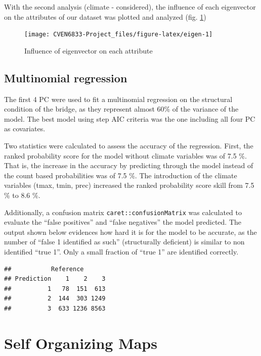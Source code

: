\documentclass[]{book}
\theoremstyle{definition}
\theoremstyle{definition}
\theoremstyle{definition}
\theoremstyle{remark}
\begin{document}
With the second analysis (climate - considered), the influence of each
eigenvector on the attributes of our dataset was plotted and analyzed
(fig. \ref{fig:eigen})

\begin{figure}

{\centering \texttt{[image: CVEN6833-Project\_files/figure-latex/eigen-1]} 

}

\caption{Influence of eigenvector on each attribute}\label{fig:eigen}
\end{figure}

\subsection{Multinomial regression}\label{multinomial-regression}

The first 4 PC were used to fit a multinomial regression on the
structural condition of the bridge, as they represent almost 60\% of the
variance of the model. The best model using step AIC criteria was the
one including all four PC as covariates.

Two statistics were calculated to assess the accuracy of the regression.
First, the ranked probability score for the model without climate
variables was of 7.5 \%. That is, the increase in the accuracy by
predicting through the model instead of the count based probabilities
was of 7.5 \%. The introduction of the climate variables (tmax, tmin,
prec) increased the ranked probability score skill from 7.5 \% to 8.6
\%.

Additionally, a confusion matrix \texttt{caret::confusionMatrix} was
calculated to evaluate the ``false positives'' and ``false negatives''
the model predicted. The output shown below evidences how hard it is for
the model to be accurate, as the number of ``false 1 identified as
such'' (structurally deficient) is similar to non identified ``true 1''.
Only a small fraction of ``true 1'' are identified correctly.

\begin{verbatim}
##           Reference
## Prediction    1    2    3
##          1   78  151  613
##          2  144  303 1249
##          3  633 1236 8563
\end{verbatim}

\section{Self Organizing Maps}\label{self-organizing-maps}
\end{document}
